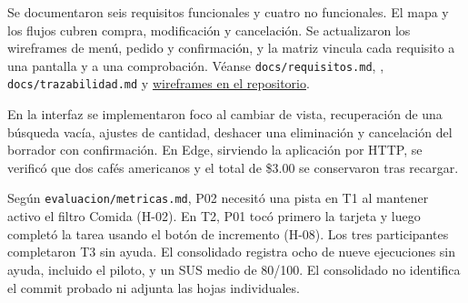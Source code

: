 Se documentaron seis requisitos funcionales y cuatro no funcionales. El mapa y los flujos cubren compra, modificación y cancelación. Se actualizaron los wireframes de menú, pedido y confirmación, y la matriz vincula cada requisito a una pantalla y a una comprobación. Véanse \texttt{docs/requisitos.md}, , \texttt{docs/trazabilidad.md} y \href{https://github.com/Sax300-cpu/Prueba-Practica-IHC_2p/blob/develop/prototipos/wireframes/cafeu-wireframes.html}{wireframes en el repositorio}.

En la interfaz se implementaron foco al cambiar de vista, recuperación de una búsqueda vacía, ajustes de cantidad, deshacer una eliminación y cancelación del borrador con confirmación. En Edge, sirviendo la aplicación por HTTP, se verificó que dos cafés americanos y el total de \$3.00 se conservaron tras recargar.

Según \texttt{evaluacion/metricas.md}, P02 necesitó una pista en T1 al mantener activo el filtro Comida (H-02). En T2, P01 tocó primero la tarjeta y luego completó la tarea usando el botón de incremento (H-08). Los tres participantes completaron T3 sin ayuda. El consolidado registra ocho de nueve ejecuciones sin ayuda, incluido el piloto, y un SUS medio de 80/100. El consolidado no identifica el commit probado ni adjunta las hojas individuales.
